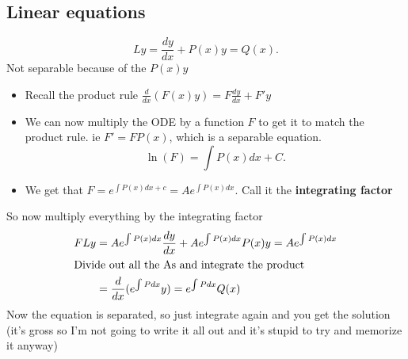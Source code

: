 \documentclass{article}
\begin{document}
\subsection{Linear equations}
\[
	Ly = \frac{dy}{dx} + P(x)y = Q(x)
.\] 
Not separable because of the $P(x)y$
\begin{itemize}
	\item Recall the product rule $\frac{d}{dx} (F(x)y) = F \frac{dy}{dx} + F'y$
	\item We can now multiply the ODE by a function $F$ to get it to match the product rule. ie $F' = F  P(x)$, which is a separable equation.
	\[
		\ln(F) = \int P(x) dx + C
	.\]
\item We get that $F = e^{\int P(x) dx + c} = Ae^{\int P(x) dx}$. Call it the \textbf{integrating factor}
\end{itemize}
So now multiply everything by the integrating factor
\begin{align}
	FLy &= Ae^{\int P(x)dx} \frac{dy}{dx} + A e^{\int P(x) dx} P(x) y = Ae^{\int P(x)dx} \\
	\intertext{Divide out all the As and integrate the product}
	    &= \frac{d}{dx}(e^{\int P dx}y) = e^{\int P dx}Q(x)
\end{align}
Now the equation is separated, so just integrate again and you get the solution (it's gross so I'm not going to write it all out and it's stupid to try and memorize it anyway)
\end{document}
